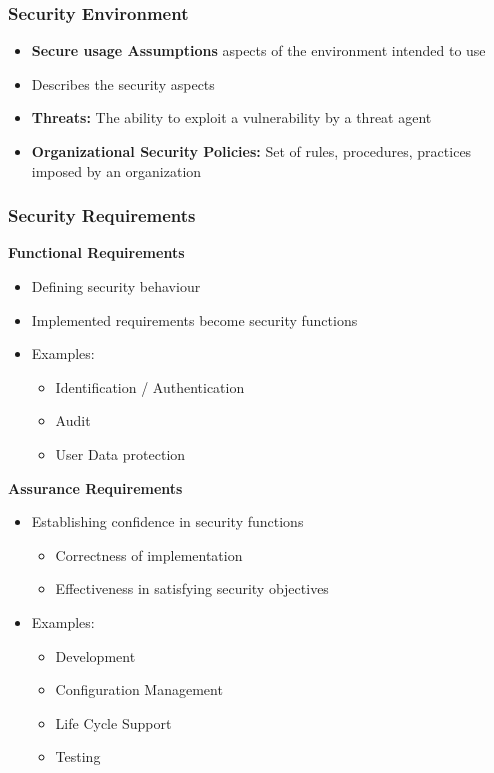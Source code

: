 \subsubsection{Security Environment}
\begin{itemize}
    \item \textbf{Secure usage Assumptions} aspects of the environment intended to use
    \item Describes the security aspects
    \item \textbf{Threats:} The ability to exploit a vulnerability by a threat agent
    \item \textbf{Organizational Security Policies:} Set of rules, procedures, practices imposed by an organization
\end{itemize}

\subsubsection{Security Requirements}
\textbf{Functional Requirements}
\begin{itemize}
    \item Defining security behaviour
    \item Implemented requirements become security functions
    \item Examples:
    \begin{itemize}
        \item Identification / Authentication
        \item Audit
        \item User Data protection
    \end{itemize}
\end{itemize}
\textbf{Assurance Requirements}
\begin{itemize}
    \item Establishing confidence in security functions
    \begin{itemize}
        \item Correctness of implementation
        \item Effectiveness in satisfying security objectives
    \end{itemize}
    \item Examples:
    \begin{itemize}
        \item Development
        \item Configuration Management
        \item Life Cycle Support
        \item Testing
    \end{itemize}
\end{itemize}

